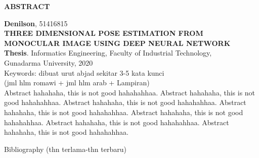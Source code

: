 \newpage %
\begin{center}
\begin{large}\textbf{ABSTRACT}\end{large}
\end{center}

\vspace{5mm} 

\noindent \textbf{Denilson}, 51416815 \\
\textbf{THREE DIMENSIONAL POSE ESTIMATION FROM MONOCULAR IMAGE USING DEEP NEURAL NETWORK}\\
\textbf{Thesis}. Informatics Engineering, Faculty of Industrial Technology, \\
Gunadarma University, 2020\\
Keywords: dibuat urut abjad sekitar 3-5 kata kunci\\
\noindent (jml hlm romawi + jml hlm arab + Lampiran)\\

Abstract hahahaha, this is not good hahahahhaa.
Abstract hahahaha, this is not good hahahahhaa.
Abstract hahahaha, this is not good hahahahhaa.
Abstract hahahaha, this is not good hahahahhaa.
Abstract hahahaha, this is not good hahahahhaa.
Abstract hahahaha, this is not good hahahahhaa.
Abstract hahahaha, this is not good hahahahhaa.

\noindent Bibliography (thn terlama-thn terbaru)
